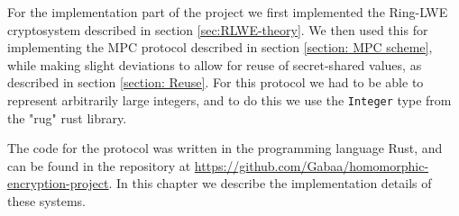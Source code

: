 \documentclass[../main.tex]{subfiles}
\begin{document}
\noindent For the implementation part of the project we first implemented the Ring-LWE cryptosystem described in section \ref{sec:RLWE-theory}. We then used this for implementing the MPC protocol described in section \ref{section: MPC scheme}, while making slight deviations to allow for reuse of secret-shared values, as described in section \ref{section: Reuse}.
For this protocol we had to be able to represent arbitrarily large integers, and to do this we use the \lstinline{Integer} type from the "rug" rust library.

The code for the protocol was written in the programming language Rust, and can be found in the repository at \url{https://github.com/Gabaa/homomorphic-encryption-project}.
In this chapter we describe the implementation details of these systems.
\end{document}
